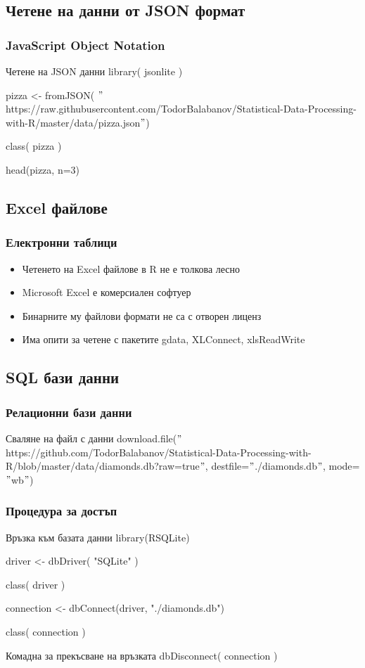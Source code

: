 \documentclass{beamer}
\begin{document}
\subsection{Четене на данни от JSON формат}

\begin{frame}
\frametitle{JavaScript Object Notation}
\begin{block}{Четене на JSON данни}
library( jsonlite )
 
pizza <- fromJSON( $"$https://raw.githubusercontent.com/TodorBalabanov/Statistical-Data-Processing-with-R/master/data/pizza.json$"$)

class( pizza )

head(pizza, n=3)
\end{block}
\end{frame}

\subsection{Excel файлове}

\begin{frame}
\frametitle{Електронни таблици}
\begin{itemize}
	\item Четенето на Excel файлове в R не е толкова лесно
	\item Microsoft Excel е комерсиален софтуер
	\item Бинарните му файлови формати не са с отворен лиценз
	\item Има опити за четене с пакетите gdata, XLConnect, xlsReadWrite
\end{itemize}
\end{frame}

\subsection{SQL бази данни}

\begin{frame}
\frametitle{Релационни бази данни}
\begin{block}{Сваляне на файл с данни}
download.file($"$https://github.com/TodorBalabanov/Statistical-Data-Processing-with-R/blob/master/data/diamonds.db?raw=true$"$, destfile=$"$./diamonds.db$"$, mode=$"$wb$"$)
\end{block}
\end{frame}

\begin{frame}
\frametitle{Процедура за достъп}
\begin{block}{Връзка към базата данни}
library(RSQLite)

driver <- dbDriver( "SQLite" )

class( driver )

connection <- dbConnect(driver, "./diamonds.db")

class( connection )
\end{block}

\begin{block}{Комадна за прекъсване на връзката}
dbDisconnect( connection )
\end{block}
\end{frame}
\end{document}
